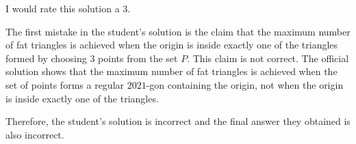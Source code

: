I would rate this solution a 3.

The first mistake in the student's solution is the claim that the maximum number of fat triangles is achieved when the origin is inside exactly one of the triangles formed by choosing 3 points from the set $P$. This claim is not correct. The official solution shows that the maximum number of fat triangles is achieved when the set of points forms a regular $2021$-gon containing the origin, not when the origin is inside exactly one of the triangles.

Therefore, the student's solution is incorrect and the final answer they obtained is also incorrect.
